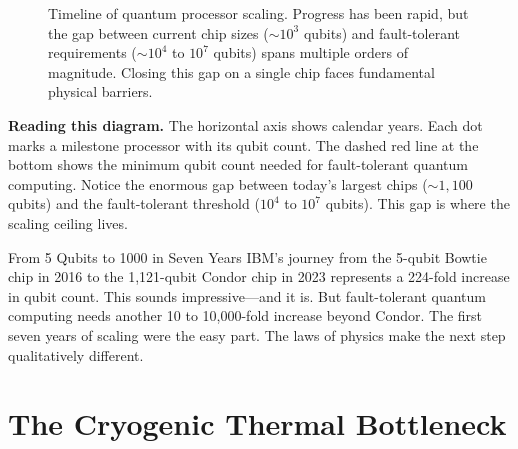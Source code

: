 \begin{figure}[htbp]
    \caption{Timeline of quantum processor scaling. Progress has been rapid, but the gap between current chip sizes ($\sim 10^3$ qubits) and fault-tolerant requirements ($\sim 10^4$ to $10^7$ qubits) spans multiple orders of magnitude. Closing this gap on a single chip faces fundamental physical barriers.}
    \label{fig:scaling_timeline}
    \end{figure}

\noindent \textbf{Reading this diagram.} The horizontal axis shows calendar years. Each dot marks a milestone processor with its qubit count. The dashed red line at the bottom shows the minimum qubit count needed for fault-tolerant quantum computing. Notice the enormous gap between today's largest chips ($\sim 1{,}100$ qubits) and the fault-tolerant threshold ($10^4$ to $10^7$ qubits). This gap is where the scaling ceiling lives.

\begin{historicalbox}{{From 5 Qubits to 1000 in Seven Years}}
IBM's journey from the 5-qubit Bowtie chip in 2016 to the 1,121-qubit Condor chip in 2023 represents a 224-fold increase in qubit count. This sounds impressive---and it is. But fault-tolerant quantum computing needs another 10 to 10,000-fold increase beyond Condor. The first seven years of scaling were the easy part. The laws of physics make the next step qualitatively different.
\end{historicalbox}


\section{The Cryogenic Thermal Bottleneck}
\label{sec:cryogenic_bottleneck}

